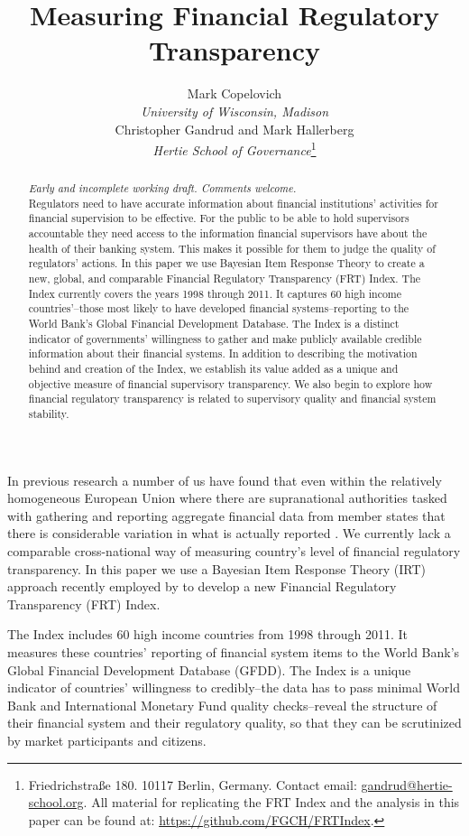 \documentclass[a4paper]{article}
\title{Measuring Financial Regulatory Transparency}
\author{Mark Copelovich \\ \emph{University of Wisconsin, Madison} \\[0.5cm] Christopher Gandrud and Mark Hallerberg \\
    {\emph{Hertie School of Governance}}\footnote{Friedrichstra{\ss}e 180. 10117 Berlin, Germany. Contact email: \href{mailto:gandrud@hertie-school.org}{gandrud@hertie-school.org}. All material for replicating the FRT Index and the analysis in this paper can be found at: \url{https://github.com/FGCH/FRTIndex}.}}
\begin{document}
\maketitle

\begin{abstract}
\noindent \emph{Early and incomplete working draft. Comments welcome.} \\
    Regulators need to have accurate information about financial institutions' activities for financial supervision to be effective. For the public to be able to hold supervisors accountable they need access to the information financial supervisors have about the health of their banking system. This makes it possible for them to judge the quality of regulators' actions. In this paper we use Bayesian Item Response Theory to create a new, global, and comparable Financial Regulatory Transparency (FRT) Index. The Index currently covers the years 1998 through 2011. It captures 60 high income countries'--those most likely to have developed financial systems--reporting to the World Bank's Global Financial Development Database. The Index is a distinct indicator of governments' willingness to gather and make publicly available credible information about their financial systems. In addition to describing the motivation behind and creation of the Index, we establish its value added as a unique and objective measure of financial supervisory transparency. We also begin to explore how financial regulatory transparency is related to supervisory quality and financial system stability.
\end{abstract}

In previous research a number of us have found that even within the relatively homogeneous European Union where there are supranational authorities tasked with gathering and reporting aggregate financial data from member states that there is considerable variation in what is actually reported \cite[see][]{Gandrud2014a}. We currently lack a comparable cross-national way of measuring country's level of financial regulatory transparency. In this paper we use a Bayesian Item Response Theory (IRT) approach recently employed by \cite{Hollyer2014} to develop a new Financial Regulatory Transparency (FRT) Index.

The Index includes 60 high income countries from 1998 through 2011. It measures these countries' reporting of financial system items to the World Bank's Global Financial Development Database (GFDD). The Index is a unique indicator of countries' willingness to credibly--the data has to pass minimal World Bank and International Monetary Fund quality checks--reveal the structure of their financial system and their regulatory quality, so that they can be scrutinized by market participants and citizens.
\end{document}
